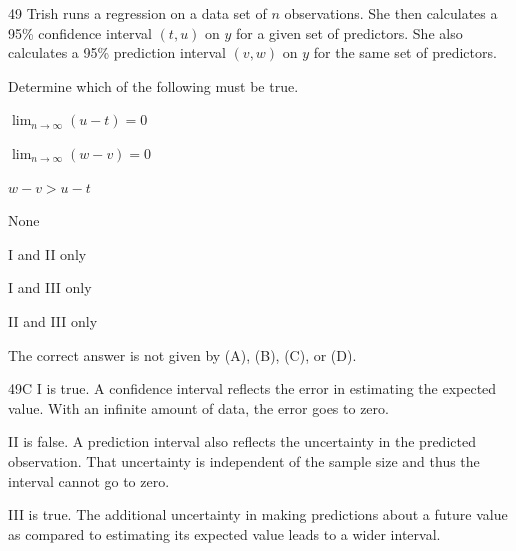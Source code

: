 \begin{question}{49}
Trish runs a regression on a data set of $n$ observations. She then calculates a 95\% confidence interval $(t, u)$ on $y$ for a given set of predictors. She also calculates a 95\% prediction interval $(v, w)$ on $y$ for the same set of predictors.

Determine which of the following must be true.

\begin{statements}
\item $\displaystyle \lim_{n \to \infty} (u - t) = 0$
\item $\displaystyle \lim_{n \to \infty} (w - v) = 0$
\item $w - v > u - t$
\end{statements}

\begin{choices}
\item None
\item I and II only
\item I and III only
\item II and III only
\item The correct answer is not given by (A), (B), (C), or (D).
\end{choices}
\end{question}
\begin{solution}{49}{C}
I is true. A confidence interval reflects the error in estimating the expected value. With an infinite amount of data, the error goes to zero.

II is false. A prediction interval also reflects the uncertainty in the predicted observation. That uncertainty is independent of the sample size and thus the interval cannot go to zero.

III is true. The additional uncertainty in making predictions about a future value as compared to estimating its expected value leads to a wider interval.
\end{solution}

